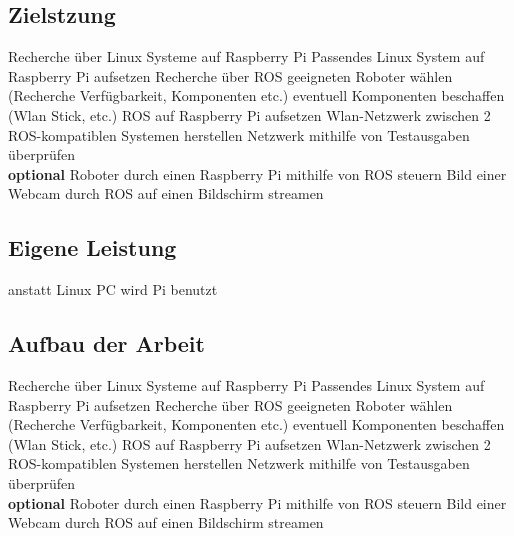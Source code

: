 \documentclass[12pt]{article}
\begin{document}







\subsection{Zielstzung}

Recherche über Linux Systeme auf Raspberry Pi
Passendes Linux System auf Raspberry Pi aufsetzen					
Recherche über ROS									
geeigneten Roboter wählen (Recherche Verfügbarkeit, Komponenten etc.)	
eventuell Komponenten beschaffen (Wlan Stick, etc.)				
ROS auf Raspberry Pi aufsetzen
Wlan-Netzwerk zwischen 2 ROS-kompatiblen Systemen herstellen
Netzwerk mithilfe von Testausgaben überprüfen \\

{\bf optional}
Roboter durch einen Raspberry Pi mithilfe von ROS steuern
Bild einer Webcam durch ROS auf einen Bildschirm streamen

\subsection{Eigene Leistung}

anstatt Linux PC wird Pi benutzt

\subsection{Aufbau der Arbeit}

Recherche über Linux Systeme auf Raspberry Pi
Passendes Linux System auf Raspberry Pi aufsetzen					
Recherche über ROS									
geeigneten Roboter wählen (Recherche Verfügbarkeit, Komponenten etc.)	
eventuell Komponenten beschaffen (Wlan Stick, etc.)				
ROS auf Raspberry Pi aufsetzen		
Wlan-Netzwerk zwischen 2 ROS-kompatiblen Systemen herstellen
Netzwerk mithilfe von Testausgaben überprüfen \\

{\bf optional}
Roboter durch einen Raspberry Pi mithilfe von ROS steuern
Bild einer Webcam durch ROS auf einen Bildschirm streamen
\end{document}
